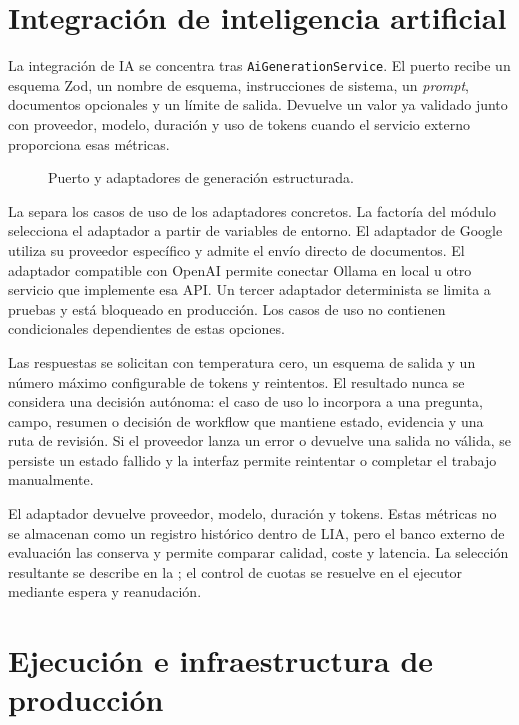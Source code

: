 \section{Integración de inteligencia artificial}
\label{sec:ai-architecture}

La integración de IA se concentra tras \texttt{AiGenerationService}. El puerto
recibe un esquema Zod, un nombre de esquema, instrucciones de sistema, un
\emph{prompt}, documentos opcionales y un límite de salida. Devuelve un valor
ya validado junto con proveedor, modelo, duración y uso de tokens cuando el
servicio externo proporciona esas métricas.

\begin{figure}[htbp]
  \centering
  \resizebox{\textwidth}{!}{
    
  }
  \caption{Puerto y adaptadores de generación estructurada.}
  \label{fig:ai-ports-adapters}
\end{figure}

La  separa los casos de uso de los adaptadores
concretos. La factoría del módulo selecciona el adaptador a partir de variables
de entorno. El adaptador de Google utiliza su proveedor específico y admite el
envío directo de documentos. El adaptador compatible con OpenAI permite
conectar Ollama en local u otro servicio que implemente esa API. Un tercer
adaptador determinista se limita a pruebas y está bloqueado en producción. Los
casos de uso no contienen condicionales dependientes de estas opciones.

Las respuestas se solicitan con temperatura cero, un esquema de salida y un
número máximo configurable de tokens y reintentos. El resultado nunca se
considera una decisión autónoma: el caso de uso lo incorpora a una pregunta,
campo, resumen o decisión de workflow que mantiene estado, evidencia y una
ruta de revisión. Si el proveedor lanza un error o devuelve una salida no
válida, se persiste un estado fallido y la interfaz permite reintentar o
completar el trabajo manualmente.

El adaptador devuelve proveedor, modelo, duración y tokens. Estas métricas no
se almacenan como un registro histórico dentro de LIA, pero el banco externo de
evaluación las conserva y permite comparar calidad, coste y latencia. La
selección resultante se describe en la ; el control
de cuotas se resuelve en el ejecutor mediante espera y reanudación.

\section{Ejecución e infraestructura de producción}
\label{sec:production-infrastructure}

